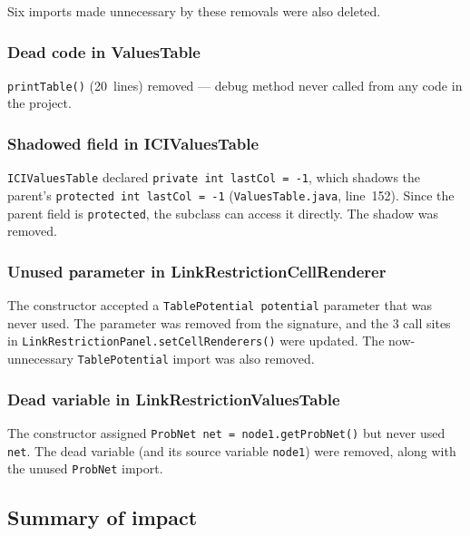 \documentclass[12pt,a4paper]{article}
\newcommand{\code}[1]{\texttt{#1}}
\newcommand{\file}[1]{\texttt{#1}}
\begin{document}
Six imports made unnecessary by these removals were also deleted.

\subsubsection{Dead code in ValuesTable}

\code{printTable()} (20~lines) removed --- debug method never called
from any code in the project.

\subsubsection{Shadowed field in ICIValuesTable}

\code{ICIValuesTable} declared \code{private int lastCol = -1}, which
shadows the parent's \code{protected int lastCol = -1}
(\file{ValuesTable.java}, line~152). Since the parent field is
\code{protected}, the subclass can access it directly. The shadow was
removed.

\subsubsection{Unused parameter in LinkRestrictionCellRenderer}

The constructor accepted a \code{TablePotential potential} parameter
that was never used. The parameter was removed from the signature, and
the 3 call sites in \code{LinkRestrictionPanel.setCellRenderers()} were
updated. The now-unnecessary \code{TablePotential} import was also
removed.

\subsubsection{Dead variable in LinkRestrictionValuesTable}

The constructor assigned \code{ProbNet net = node1.getProbNet()} but
never used \code{net}. The dead variable (and its source variable
\code{node1}) were removed, along with the unused \code{ProbNet} import.

\subsection{Summary of impact}
\end{document}
